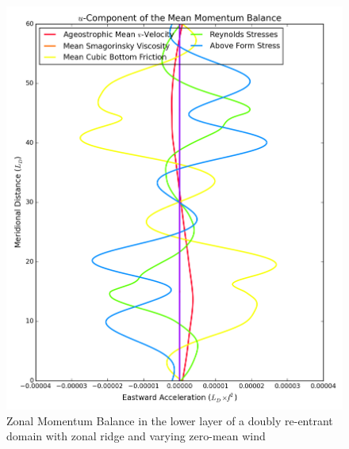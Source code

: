 \documentclass[12pt,a4paper]{report}
\begin{document}
 
 \begin{figure}
 	\centering
 	\begin{minipage}[b]{0.45\linewidth}
 		\centering
 		\includegraphics[width=\linewidth ]{umom_1}
 		\caption{Zonal Momentum Balance in the lower layer of 
 			a doubly re-entrant domain with 
 			zonal ridge and varying zero-mean wind}
 		\label{fig:umomlayer1}
 	\end{minipage}
 	\quad
 	\begin{minipage}[b]{0.45\linewidth}
 		\centering

\end{minipage}
\end{figure}
\end{document}
